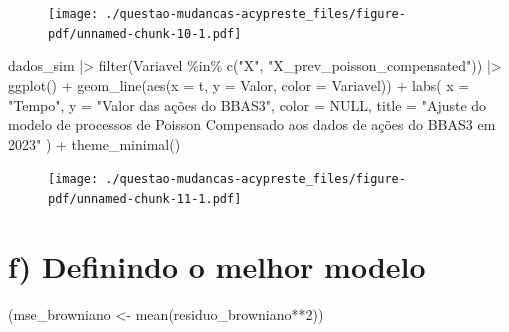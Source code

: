 \documentclass[
  letterpaper,
  DIV=11,
  numbers=noendperiod]{scrreprt}
\newenvironment{Shaded}{\begin{snugshade}}{\end{snugshade}}
\newcommand{\AttributeTok}[1]{\textcolor[rgb]{0.40,0.45,0.13}{#1}}
\newcommand{\ConstantTok}[1]{\textcolor[rgb]{0.56,0.35,0.01}{#1}}
\newcommand{\DecValTok}[1]{\textcolor[rgb]{0.68,0.00,0.00}{#1}}
\newcommand{\FunctionTok}[1]{\textcolor[rgb]{0.28,0.35,0.67}{#1}}
\newcommand{\NormalTok}[1]{\textcolor[rgb]{0.00,0.23,0.31}{#1}}
\newcommand{\OtherTok}[1]{\textcolor[rgb]{0.00,0.23,0.31}{#1}}
\newcommand{\SpecialCharTok}[1]{\textcolor[rgb]{0.37,0.37,0.37}{#1}}
\newcommand{\StringTok}[1]{\textcolor[rgb]{0.13,0.47,0.30}{#1}}
\begin{document}
\begin{figure}[H]

{\centering \texttt{[image: ./questao-mudancas-acypreste\_files/figure-pdf/unnamed-chunk-10-1.pdf]}

}

\end{figure}

\begin{Shaded}
\begin{Highlighting}[]
\NormalTok{dados\_sim }\SpecialCharTok{|\textgreater{}}
    \FunctionTok{filter}\NormalTok{(Variavel }\SpecialCharTok{\%in\%} \FunctionTok{c}\NormalTok{(}\StringTok{"X"}\NormalTok{, }\StringTok{"X\_prev\_poisson\_compensated"}\NormalTok{)) }\SpecialCharTok{|\textgreater{}}
    \FunctionTok{ggplot}\NormalTok{() }\SpecialCharTok{+}
    \FunctionTok{geom\_line}\NormalTok{(}\FunctionTok{aes}\NormalTok{(}\AttributeTok{x =}\NormalTok{ t, }\AttributeTok{y =}\NormalTok{ Valor, }\AttributeTok{color =}\NormalTok{ Variavel)) }\SpecialCharTok{+}
    \FunctionTok{labs}\NormalTok{(}
        \AttributeTok{x =} \StringTok{"Tempo"}\NormalTok{,}
        \AttributeTok{y =} \StringTok{"Valor das ações do BBAS3"}\NormalTok{,}
        \AttributeTok{color =} \ConstantTok{NULL}\NormalTok{,}
        \AttributeTok{title =} \StringTok{"Ajuste do modelo de processos de Poisson Compensado}
\StringTok{          aos dados de ações do BBAS3 em 2023"}
\NormalTok{    ) }\SpecialCharTok{+}
    \FunctionTok{theme\_minimal}\NormalTok{()}
\end{Highlighting}
\end{Shaded}

\begin{figure}[H]

{\centering \texttt{[image: ./questao-mudancas-acypreste\_files/figure-pdf/unnamed-chunk-11-1.pdf]}

}

\end{figure}

\hypertarget{f-definindo-o-melhor-modelo}{%
\section*{f) Definindo o melhor
modelo}\label{f-definindo-o-melhor-modelo}}


\begin{Shaded}
\begin{Highlighting}[]
\NormalTok{(mse\_browniano }\OtherTok{\textless{}{-}} \FunctionTok{mean}\NormalTok{(residuo\_browniano}\SpecialCharTok{**}\DecValTok{2}\NormalTok{))}
\end{Highlighting}
\end{Shaded}
\end{document}
